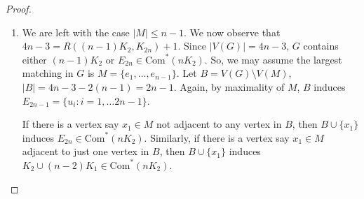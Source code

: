 \documentclass[a4paper,12pt]{article}
\begin{document}
\begin{proof}
\begin{enumerate}
{\begin{enumerate}
{\begin{itemize}
\item{If any vertex say $u_1 \in B$  is adjacent to two vertices from different edges in $M$, say $x_1$ and $x_2$ without loss of generality, then the set of vertices  $x_1$, $u_1$, $x_i$, $y_i$ ($i = 2, \dots, n$), $x_n$, $u_1$ induces a subgraph properly containing $nK_2$, hence a member of $\text{Com}^*(nK_2)$\,. }
\end{itemize}

Hence every vertex in $B$ must be adjacent to one or two vertices in $M$, and in the case of two vertices they must be $x_i$ and $y_i$. 
Similarly as in the case of $3K_2$, here $|B|=2n-3>n=|M|$, therefore two vertices from $B$ have their neighbourhood in the same matching edge, with no neighbours in any of the other $n-1$ edges of $M$.
Thus, also here an induced subgraph $(n-1)K_2 \cup 2K_1 \in \text{Com}^*(nK_2)$ occurs.}


%

\item{We are left with the case $|M|\leq n-1$.
We now observe that $4n - 3  = R( (n-1)K_2 , K_{2n} ) +1$.
Since $|V(G)|= 4n-3$, $G$ contains either $( n-1)K_2$  or $E_{2n} \in  \text{Com}^*(nK_2)$.  So, we may assume the largest matching in $G$ is $M  = \{ e_1,\ldots,e_{n-1}\}$.  Let $B = V(G) \setminus V(M)$, $|B| = 4n-3 - 2(n-1)  = 2n-1$.  Again, by maximality of $M$, $B$ induces $E_{2n-1}=\{u_i: i=1,\ldots 2n-1\}$.

If there is a vertex say $x_1 \in M$ not adjacent to any vertex in $B$, then $B \cup \{x_1\}$ induces $ E_{2n} \in \text{Com}^*(nK_2)$.  
Similarly, if there is a vertex say $x_1 \in M$  adjacent to just one vertex in  $B$, then $B \cup  \{x_1\}$  induces $K_2  \cup  (n-2)K_1 \in \text{Com}^*(nK_2)$.

}
\end{enumerate}}
\end{enumerate}
\end{proof}
\end{document}
